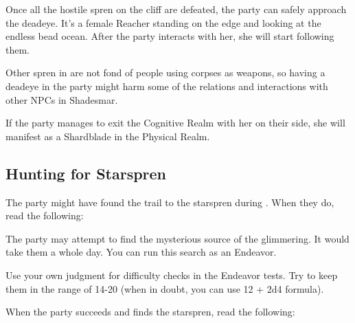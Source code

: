 Once all the hostile spren on the cliff are defeated, the party can safely approach the deadeye. It's a female Reacher standing on the edge and looking at the endless bead ocean. After the party interacts with her, she will start following them.

Other spren in are not fond of people using corpses as weapons, so having a deadeye in the party might harm some of the relations and interactions with other NPCs in Shadesmar.

 If the party manages to exit the Cognitive Realm with her on their side, she will manifest as a Shardblade in the Physical Realm.
 




\subsection{Hunting for Starspren}
\label{ssec:celebrantStarspren}

The party might have found the trail to the starspren during . When they do, read the following:


The party may attempt to find the mysterious source of the glimmering. It would take them a whole day. You can run this search as an Endeavor.

Use your own judgment for difficulty checks in the Endeavor tests. Try to keep them in the range of 14-20 (when in doubt, you can use 12 + 2d4 formula).

 When the party succeeds and finds the starspren, read the following:


